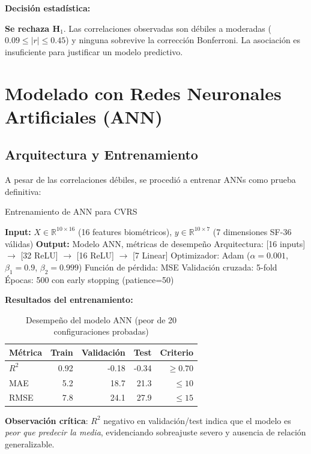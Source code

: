 \documentclass[12pt,letterpaper,twoside]{report}
\newcommand{\R}{\mathbb{R}}
\begin{document}
\begin{decisionbox}
\textbf{Decisión estadística:}

\textbf{Se rechaza H$_1$}. Las correlaciones observadas son débiles a moderadas ($0.09 \leq |r| \leq 0.45$) y ninguna sobrevive la corrección Bonferroni. La asociación es insuficiente para justificar un modelo predictivo.
\end{decisionbox}

\section{Modelado con Redes Neuronales Artificiales (ANN)}

\subsection{Arquitectura y Entrenamiento}

A pesar de las correlaciones débiles, se procedió a entrenar ANNs como prueba definitiva:

\begin{algorithm}[H]
\caption{Entrenamiento de ANN para CVRS}
\label{alg:ann_training}
\begin{algorithmic}[1]
\State \textbf{Input:} $X \in \R^{10 \times 16}$ (16 features biométricos), $y \in \R^{10 \times 7}$ (7 dimensiones SF-36 válidas)
\State \textbf{Output:} Modelo ANN, métricas de desempeño
\State
\State Arquitectura: [16 inputs] $\to$ [32 ReLU] $\to$ [16 ReLU] $\to$ [7 Linear]
\State Optimizador: Adam ($\alpha=0.001$, $\beta_1=0.9$, $\beta_2=0.999$)
\State Función de pérdida: MSE
\State Validación cruzada: 5-fold
\State Épocas: 500 con early stopping (patience=50)
\end{algorithmic}
\end{algorithm}

\begin{calculobox}
\textbf{Resultados del entrenamiento:}

\begin{table}[H]
\centering
\begin{tabular}{@{}lrrrr@{}}
\toprule
\textbf{Métrica} & \textbf{Train} & \textbf{Validación} & \textbf{Test} & \textbf{Criterio} \\
\midrule
$R^2$            & 0.92  & -0.18 & -0.34 & $\geq 0.70$ \\
MAE              & 5.2   & 18.7  & 21.3  & $\leq 10$ \\
RMSE             & 7.8   & 24.1  & 27.9  & $\leq 15$ \\
\bottomrule
\end{tabular}
\caption{Desempeño del modelo ANN (peor de 20 configuraciones probadas)}
\label{tab:ann_results}
\end{table}

\textbf{Observación crítica}: $R^2$ negativo en validación/test indica que el modelo es \textit{peor que predecir la media}, evidenciando sobreajuste severo y ausencia de relación generalizable.
\end{calculobox}
\end{document}
